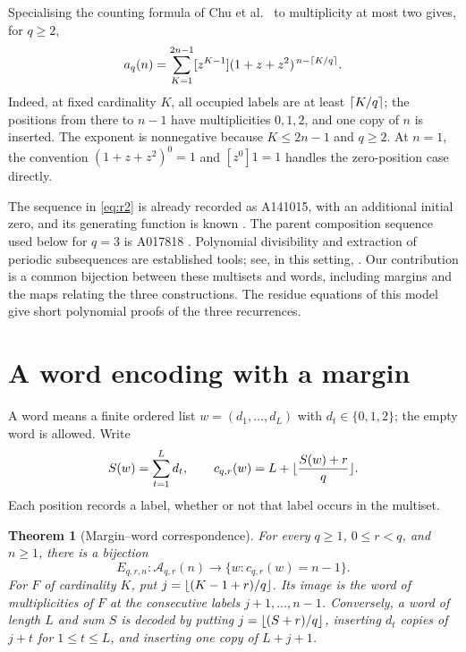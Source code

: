 \documentclass[11pt,a4paper]{article}
\newtheorem{theorem}{Theorem}[section]
\theoremstyle{remark}
\newcommand{\A}{\mathcal A}
\DeclarePairedDelimiter{\floor}{\lfloor}{\rfloor}
\DeclarePairedDelimiter{\ceil}{\lceil}{\rceil}
\begin{document}
Specialising the counting formula of Chu et al.\
\cite[Section~5]{CGKMTV} to multiplicity at most two gives, for $q\ge2$,
\begin{equation}\label{eq:occupancy}
 a_q(n)=\sum_{K=1}^{2n-1}[z^{K-1}](1+z+z^2)^{\,n-\ceil{K/q}}.
\end{equation}
Indeed, at fixed cardinality $K$, all occupied labels are at least
$\ceil{K/q}$; the positions from there to $n-1$ have multiplicities $0,1,2$,
and one copy of $n$ is inserted. The exponent is nonnegative because
$K\le2n-1$ and $q\ge2$. At $n=1$, the convention $(1+z+z^2)^0=1$ and
$[z^0]1=1$ handles the zero-position case directly.

The sequence in \eqref{eq:r2} is already recorded as A141015, with an
additional initial zero, and its generating function is known
\cite{OEIS141015}. The parent composition sequence used below for $q=3$ is
A017818 \cite{OEIS017818}. Polynomial divisibility and extraction of periodic
subsequences are established tools; see, in this setting,
\cite[Section~3.2, especially Lemma~5]{CV}. Our contribution is a common
bijection between these multisets and words, including margins and the
maps relating the three constructions. The residue equations of this
model give short polynomial proofs of the three recurrences.

\section{A word encoding with a margin}

A word means a finite ordered list $w=(d_1,\ldots,d_L)$ with
$d_t\in\{0,1,2\}$; the empty word is allowed. Write
\begin{equation}\label{eq:cost}
 S(w)=\sum_{t=1}^L d_t,\qquad
 c_{q,r}(w)=L+\floor{\frac{S(w)+r}{q}}.
\end{equation}
Each position records a label, whether or not that label occurs in the multiset.

\begin{theorem}[Margin--word correspondence]\label{thm:encoding}
For every $q\ge1$, $0\le r<q$, and $n\ge1$, there is a bijection
\[
 E_{q,r,n}:\A_{q,r}(n)\longrightarrow
 \{w:c_{q,r}(w)=n-1\}.
\]
For $F$ of cardinality $K$, put $j=\floor{(K-1+r)/q}$. Its image is the
word of multiplicities of $F$ at the consecutive labels $j+1,\ldots,n-1$.
Conversely, a word of length $L$ and sum $S$ is decoded by putting
$j=\floor{(S+r)/q}$, inserting $d_t$ copies of $j+t$ for $1\le t\le L$,
and inserting one copy of $L+j+1$.
\end{theorem}
\end{document}
